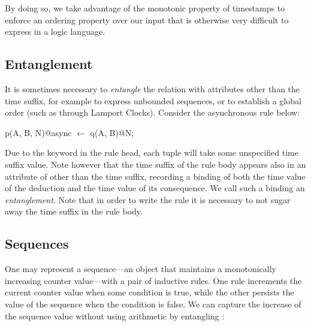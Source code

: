 
By doing so, we take advantage of the monotonic property of timestamps to enforce an ordering property over our input that is otherwise 
very difficult to express in a logic language.


\subsection{Entanglement}
\label{sec:entangle}

It is sometimes necessary to {\em entangle} the  relation
with attributes other than the time suffix, for example to express unbounded
sequences, or to establish a global order (such as through Lamport Clocks).
Consider the asynchronous rule below:

\begin{Dedalus}
p(A, B, N)@async \(\leftarrow\)
  q(A, B)@N;
\end{Dedalus}
\noindent

Due to the  keyword in the rule head, each  tuple
will take some unspecified time suffix value.  Note however that the time
suffix  of the rule body appears also in an attribute of 
other than the time suffix, recording a binding of both the time value of the
deduction and the time value of its consequence.  We call such a binding an
{\em entanglement}.   Note that in order to write the rule it is necessary to
not sugar away the time suffix in the rule body.  


\subsection{Sequences}

One may represent a sequence---an object that maintains a monotonically
increasing counter value---with a pair of inductive rules.  One rule
increments the current counter value when some condition is true, while the
other persists the value of the sequence when the condition is false.  We can
capture the increase of the sequence value without using arithmetic by
entangling :

